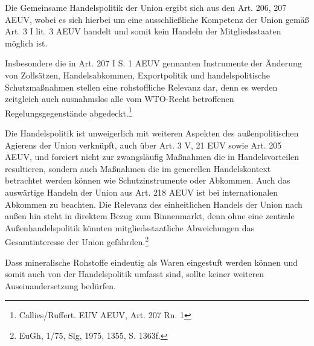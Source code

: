 \documentclass[12pt,a4paper,oneside]{book} %
\begin{document}
Die Gemeinsame Handelspolitik der Union ergibt sich aus den Art. 206, 207 AEUV, wobei es sich hierbei um eine ausschließliche Kompetenz der Union gemäß Art. 3 I lit. 3 AEUV handelt und somit kein Handeln der Mitgliedsstaaten möglich ist.\autocite{Callies/Ruffert. EUV AEUV, Art. 207 Rn. 1}

Insbesondere die in Art. 207 I S. 1 AEUV gennanten Instrumente der Änderung von Zollsätzen, Handelsabkommen, Exportpolitik und handelspolitische Schutzmaßnahmen stellen eine rohstoffliche Relevanz dar, denn es werden zeitgleich auch ausnahmslos alle vom WTO-Recht betroffenen Regelungsgegenstände abgedeckt.\footnote{Callies/Ruffert. EUV AEUV, Art. 207 Rn. 1}
	
Die Handelspolitik ist unweigerlich mit weiteren Aspekten des außenpolitischen Agierens der Union verknüpft, auch über Art. 3 V, 21 EUV sowie Art. 205 AEUV, und forciert nicht zur zwangsläufig Maßnahmen die in Handelsvorteilen resultieren, sondern auch Maßnahmen die im generellen Handelskontext betrachtet werden können wie Schutzinstrumente oder Abkommen.\autocite{Callies/Ruffert, Art. 206, Rn 3.} Auch das auswärtige Handeln der Union aus Art. 218 AEUV ist bei internationalen Abkommen zu beachten. Die Relevanz des einheitlichen Handels der Union nach außen hin steht in direktem Bezug zum Binnenmarkt, denn ohne eine zentrale Außenhandelspolitik könnten mitgliedsstaatliche Abweichungen das Gesamtinteresse der Union gefährden.\footnote{EuGh, 1/75, Slg, 1975, 1355, S. 1363f.}

Dass mineralische Rohstoffe eindeutig als Waren eingestuft werden können und somit auch von der Handelspolitik umfasst sind, sollte keiner weiteren Auseinandersetzung bedürfen.
	
\end{document}
